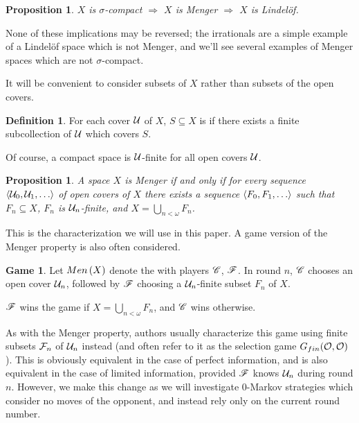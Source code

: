 \documentclass{amsart}
\newtheorem{proposition}[theorem]{Proposition}
\theoremstyle{definition}
\newtheorem{definition}[theorem]{Definition}
\newtheorem{game}[theorem]{Game}
\begin{document}
\begin{proposition}
  \(X\) is \(\sigma\)-compact
    \(\Rightarrow\)
  \(X\) is Menger
    \(\Rightarrow\)
  \(X\) is Lindel\"of.
\end{proposition}

None of these implications may be reversed; the irrationals are a simple example
of a Lindel\"of space which is not Menger, and we'll see several examples of
Menger spaces which are not \(\sigma\)-compact.

It will be convenient to consider subsets of \(X\) rather than subsets of
the open covers.

\begin{definition}
  For each cover \(\mathcal{U}\) of \(X\), \(S\subseteq X\) is
   if
  there exists a finite subcollection of \(\mathcal{U}\) which covers \(S\).
\end{definition}

Of course, a compact space is \(\mathcal{U}\)-finite for all open covers \(\mathcal{U}\).

\begin{proposition}
  A space \(X\) is Menger if and only if
  for every sequence \(\<\mc U_0,\mc U_1,\dots\>\)
  of open covers of \(X\) there exists a sequence
  \(\<F_0,F_1,\dots\>\) such that \(F_n\subseteq X\), \(F_n\) is
  \(\mathcal{U}_n\)-finite, and \(X=\bigcup_{n<\omega}F_n\).
\end{proposition}

This is the characterization we will use in this paper.
A game version of the Menger property is also often considered.

\begin{game}
  Let \(Men\left({X}\right)\) denote the  with players \(\mathscr{C}\), \(\mathscr{F}\).
  In round \(n\), \(\mathscr{C}\) chooses an open cover \(\mathcal{U}_n\), followed by \(\mathscr{F}\)
  choosing a \(\mathcal{U}_n\)-finite subset \(F_n\) of \(X\).

  \(\mathscr{F}\) wins the game if \(X = \bigcup_{n<\omega}F_n\),
  and \(\mathscr{C}\) wins otherwise.
\end{game}

As with the Menger property, authors usually characterize this game using
finite subsets \(\mathcal{F}_n\)
of \(\mathcal{U}_n\) instead (and often refer to it as the selection game
\(G_{fin}(\mathcal{O},\mathcal{O})\)).
This is obviously equivalent in the case of perfect
information, and is also equivalent
in the case of limited information, provided \(\mathscr{F}\)
knows \(\mathcal{U}_n\) during round \(n\). However, we make this change as we
will investigate \(0\)-Markov strategies which consider no moves of
the opponent, and instead rely only on the current round number.
\end{document}
